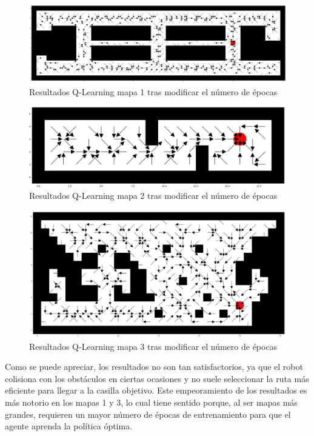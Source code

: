 \documentclass[conference,a4paper]{IEEEtran}
\begin{document}
\begin{figure}[h]
  \centering
  \includegraphics[scale=0.33]{resultado_2_qlearning_mapa_1}
  \caption{Resultados Q-Learning mapa 1 tras modificar el número de épocas}
  \label{fig:resultado_2_qlearning_mapa_1}
\end{figure}

\begin{figure}[h]
  \centering
  \includegraphics[scale=0.33]{resultado_2_qlearning_mapa_2}
  \caption{Resultados Q-Learning mapa 2 tras modificar el número de épocas}
  \label{fig:resultado_2_qlearning_mapa_2}
\end{figure}

\begin{figure}[h]
  \centering
  \includegraphics[scale=0.33]{resultado_2_qlearning_mapa_3}
  \caption{Resultados Q-Learning mapa 3 tras modificar el número de épocas}
  \label{fig:resultado_2_qlearning_mapa_3}
\end{figure}

Como se puede apreciar, los resultados no son tan satisfactorios, ya que el robot colisiona con los obstáculos en ciertas ocasiones y no suele seleccionar la ruta más eficiente para llegar a la casilla objetivo. 
Este empeoramiento de los resultados es más notorio en los mapas 1 y 3, lo cual tiene sentido porque, al ser mapas más grandes, requieren un mayor número de épocas de entrenamiento para que el agente aprenda la política óptima.\newline
\end{document}
